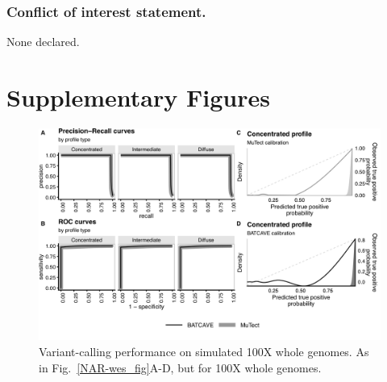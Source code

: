 \documentclass[a4,center,fleqn]{NAR}
\newcommand{\beginsupplement}{%
        \clearpage
        \onecolumn
        \setcounter{table}{0}
        \renewcommand{\thetable}{S\arabic{table}}%
        \setcounter{figure}{0}
        \renewcommand{\thefigure}{S\arabic{figure}}%
     }
\begin{document}
\subsubsection{Conflict of interest statement.} None declared.



\beginsupplement
\section{Supplementary Figures}

\begin{figure} [H]
\centering
  \includegraphics[width=\textwidth]{figures/fig_wgs.png}
  \caption{Variant-calling performance on  simulated 100X whole genomes. As in Fig.~\ref{NAR-wes_fig}A-D, but for 100X whole genomes.}
\label{NAR-wgs_fig}
\end{figure}
\end{document}
